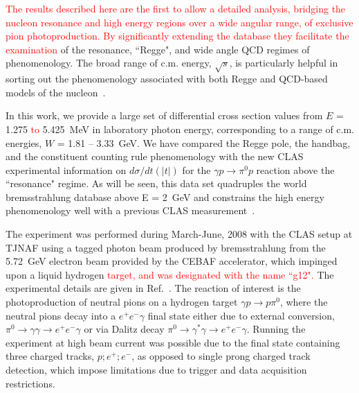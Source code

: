 \documentclass[aps,prc,twocolumn,floatfix,showpacs,preprintnumbers,amsmath,amssymb,superscriptaddress,linenumbers]{revtex4-1}
\begin{document}
\textcolor{red}{The results described here are the first to allow a detailed analysis, bridging the nucleon resonance and high energy regions over a wide angular range, of exclusive pion photoproduction. By significantly extending the database they facilitate
the examination}
%		 
		of the resonance, ``Regge", and wide angle QCD regimes of phenomenology. The 
		broad range of c.m. energy, $\sqrt{s}$, is particularly helpful in 
		sorting out the phenomenology associated with both Regge and QCD-based 
		models of the nucleon~\cite{Kroll:2017hym}.

In this work, we provide a large set of differential 
cross section values from $E$ = 1.275 \textcolor{red}{to} 5.425~MeV in laboratory photon 
energy, corresponding to a range of c.m. energies, $W$ = 1.81 -- 
3.33~GeV.  We have compared the Regge pole, the handbag, and the 
constituent counting rule phenomenology with the new CLAS experimental 
information on $d\sigma/dt(|t|)$ for the $\gamma p\rightarrow\pi^0p$ 
reaction above the ``resonance" regime. As will be seen, this data 
set quadruples the world bremsstrahlung database above E = 2~GeV and 
constrains the high energy phenomenology well with a previous CLAS 
measurement~\cite{Dugger:2007bt}.


The experiment was performed during March-June, 2008
with the CLAS setup at TJNAF using a tagged photon beam produced by 
bremsstrahlung from the 5.72~GeV electron beam provided by the CEBAF 
accelerator, which impinged upon a liquid hydrogen \textcolor{red}{target,
and was designated with the name ``g12".} 
The experimental details are given in Ref.~\cite{g12}. The reaction 
of interest is the photoproduction of neutral pions on a hydrogen 
target $\gamma p\rightarrow p\pi^0$, 
where the neutral pions decay into a $e^+e^-\gamma$ final state either due to external conversion, $\pi^0 \rightarrow\gamma\gamma 
\rightarrow e^+e^-\gamma$ or via Dalitz decay $\pi^0
\rightarrow\gamma^\ast\gamma\rightarrow e^+e^-\gamma$. Running the 
experiment at high beam current was possible due to the final state 
containing three charged tracks, $p;e^+;e^-$, as opposed to single 
prong charged track detection, which impose limitations due to trigger 
and data acquisition restrictions.
\end{document}
